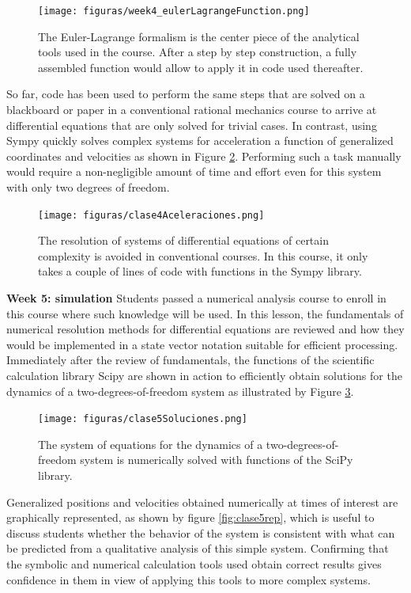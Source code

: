 \begin{figure}[ht]
    \centering
    \texttt{[image: figuras/week4\_eulerLagrangeFunction.png]}
    \caption{The Euler-Lagrange formalism is the center piece of the analytical tools used in the course. After a step by step construction, a fully assembled function would allow to apply it in code used thereafter.}
    \label{fig:week4_eulerLagrangeFunction}
\end{figure}


So far, code has been used to perform the same steps that are solved on a blackboard or paper in a conventional rational mechanics course to arrive at differential equations that are only solved for trivial cases.
In contrast, using Sympy quickly solves complex systems for acceleration a function of generalized coordinates and velocities as shown in Figure \ref{fig:clase4ac}.
Performing such a task manually would require a non-negligible amount of time and effort even for this system with only two degrees of freedom.

\begin{figure}[!ht]
\centering
\texttt{[image: figuras/clase4Aceleraciones.png]}
\caption{The resolution of systems of differential equations of certain complexity is avoided in conventional courses. In this course, it only takes a couple of lines of code with functions in the Sympy library.}
\label{fig:clase4ac}
\end{figure}



\textbf{Week 5: simulation}
Students passed a numerical analysis course to enroll in this course where such knowledge will be used.
In this lesson, the fundamentals of numerical resolution methods for differential equations are reviewed and how they would be implemented in a state vector notation suitable for efficient processing.
Immediately after the review of fundamentals, the functions of the scientific calculation library Scipy are shown in action to efficiently obtain solutions for the dynamics of a two-degrees-of-freedom system as illustrated by Figure \ref{fig:clase5sol}.

\begin{figure}[!ht]
\centering
\texttt{[image: figuras/clase5Soluciones.png]}
\caption{The system of equations for the dynamics of a two-degrees-of-freedom system is numerically solved with functions of the SciPy library.}
\label{fig:clase5sol}
\end{figure}

Generalized positions and velocities obtained numerically at times of interest are graphically represented, as shown by figure \ref{fig:clase5rep}, which is useful to discuss students whether the behavior of the system is consistent with what can be predicted from a qualitative analysis of this simple system.
Confirming that the symbolic and numerical calculation tools used obtain correct results gives confidence in them in view of applying this tools to more complex systems.

